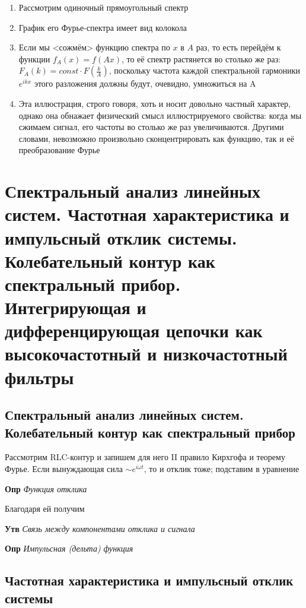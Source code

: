 \documentclass[a4paper, 14pt]{article}
\begin{document}
    \begin{enumerate}
        \item Рассмотрим одиночный прямоугольный спектр
        \item График его Фурье-спектра имеет вид колокола
        \item Если мы <сожмём> функцию спектра по $x$ в $A$ раз, то есть перейдём к функции $f_A(x) = f(Ax)$, то её
        спектр растянется во столько же раз: $F_A(k) = const \cdot F\left(\frac{k}{A}\right)$, поскольку частота каждой
        спектральной
        гармоники $e^{ikx}$ этого разложения должны будут, очевидно, умножиться на A
        \item Эта иллюстрация, строго говоря, хоть и носит довольно частный характер, однако она обнажает
        физический смысл иллюстрируемого свойства: когда мы сжимаем сигнал, его частоты во столько же раз увеличиваются.
        Другими словами, невозможно произвольно сконцентрировать как функцию, так и её преобразование Фурье
    \end{enumerate}
    
    \section{Спектральный анализ линейных систем.
    Частотная характеристика и импульсный отклик системы.
    Колебательный контур как спектральный прибор.
    Интегрирующая и дифференцирующая цепочки как высокочастотный и низкочастотный фильтры}
    
    \subsection{Спектральный анализ линейных систем. Колебательный контур как спектральный прибор}
    
    Рассмотрим RLC-контур и запишем для него II правило Кирхгофа и теорему Фурье.
    Если вынуждающая сила $\sim e^{i\omega t}$, то и отклик тоже; подставим в уравнение
    
    \textbf{Опр} \textit{Функция отклика}
    
    Благодаря ей получим
    
    \textbf{Утв} \textit{Связь между компонентами отклика и сигнала}
    
    \textbf{Опр} \textit{Импульсная (дельта) функция}
    
    \subsection{Частотная характеристика и импульсный отклик системы}
    
\end{document}
